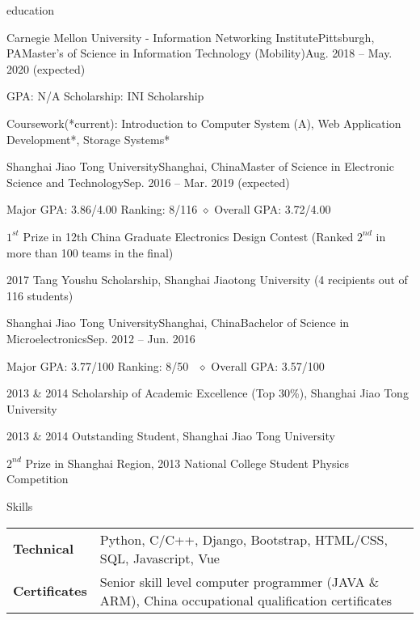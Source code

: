 \documentclass{resume_ucla} %
\begin{document}

\begin{rSection}{education}
\begin{rSubsection}{Carnegie Mellon University - Information Networking Institute}{Pittsburgh, PA}{Master's of Science in  Information Technology (Mobility)}{Aug. 2018 -- May. 2020 (expected)}
\item GPA: N/A \qquad Scholarship: INI Scholarship
\item Coursework(*current): Introduction to Computer System (A), Web Application Development*, Storage Systems*
\end{rSubsection}
\begin{rSubsection}{Shanghai Jiao Tong University}{Shanghai, China}{Master of Science in Electronic Science and Technology}{Sep. 2016 -- Mar. 2019 (expected)}
\item Major GPA: 3.86/4.00 \qquad Ranking: 8/116 \qquad $\diamond$ Overall GPA: 3.72/4.00
\item $1^{st}$ Prize in 12th China Graduate Electronics Design Contest (Ranked $2^{nd}$ in more than 100 teams in the final)
\item 2017 Tang Youshu Scholarship, Shanghai Jiaotong University (4 recipients out of 116 students)

\end{rSubsection}
\begin{rSubsection}{Shanghai Jiao Tong University}{Shanghai, China}{Bachelor of Science in Microelectronics}{Sep. 2012 -- Jun. 2016}
\item Major GPA: 3.77/100 \qquad Ranking: 8/50 \qquad \ $\diamond$ Overall GPA: 3.57/100
\item 2013 \& 2014 Scholarship of Academic Excellence (Top 30\%), Shanghai Jiao Tong University
\item 2013 \& 2014 Outstanding Student, Shanghai Jiao Tong University 
\item $2^{nd}$ Prize in Shanghai Region, 2013 National College Student Physics Competition
\end{rSubsection}

\end{rSection}

\begin{rSection}{Skills}
\begin{tabular}{ll}
\textbf{Technical \quad} & Python, C/C++, Django, Bootstrap, HTML/CSS, SQL, Javascript, Vue\\
\textbf{Certificates} & Senior skill level computer programmer (JAVA \& ARM), China occupational qualification certificates\\ 
\end{tabular}
\end{rSection}
\end{document}
